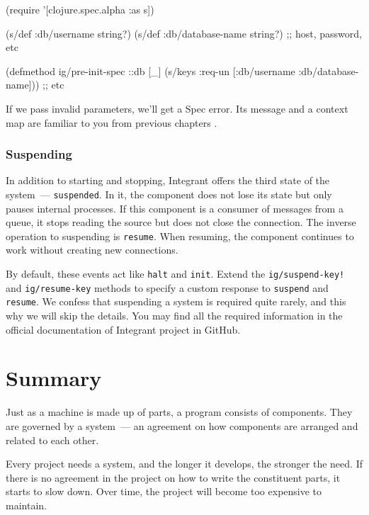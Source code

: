\else

\begin{english}
  \begin{clojure}
(require '[clojure.spec.alpha :as s])

(s/def :db/username string?)
(s/def :db/database-name string?)
;; host, password, etc

(defmethod ig/pre-init-spec ::db [_]
  (s/keys :req-un [:db/username
                   :db/database-name])) ;; etc
  \end{clojure}
\end{english}

\fi

\noindent
If we pass invalid parameters, we'll get a Spec error. Its message and a context map are familiar to you from previous chapters .

\subsubsection{Suspending}


In addition to starting and stopping, Integrant offers the third state of the system~--- \verb|suspended|. In it, the component does not lose its state but only pauses internal processes. If this component is a consumer of messages from a queue, it stops reading the source but does not close the connection. The inverse operation to suspending is \verb|resume|. When resuming, the component continues to work without creating new connections.

By default, these events act like \verb|halt| and \verb|init|. Extend the \texttt{ig/sus\-pend\--key!} and \verb|ig/resume-key| methods to specify a custom response to \verb|suspend| and \verb|resume|. We confess that suspending a system is required quite rarely, and this why we will skip the details. You may find all the required information in the official documentation of Integrant project in GitHub.

\section{Summary}

Just as a machine is made up of parts, a program consists of components. They are governed by a system~--- an agreement on how components are arranged and related to each other.

Every project needs a system, and the longer it develops, the stronger the need. If there is no agreement in the project on how to write the constituent parts, it starts to slow down. Over time, the project will become too expensive to maintain.


